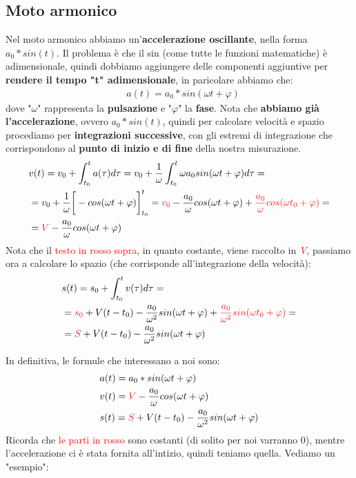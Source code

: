 		\subsection{Moto armonico}
			Nel moto armonico abbiamo un'\textbf{accelerazione oscillante}, nella forma \underline{$a_0*sin(t)$}. Il problema è che il sin (come tutte le funzioni matematiche) è adimensionale, quindi dobbiamo aggiungere delle componenti aggiuntive per \textbf{rendere il tempo "t" adimensionale}, in paricolare abbiamo che:
			\begin{align*}
				&a(t) = a_0 * sin(\omega t + \varphi)
			\end{align*}
			dove "$\omega$" rappresenta la \textbf{pulsazione} e "$\varphi$" la \textbf{fase}. Nota che \textbf{abbiamo già l'accelerazione}, ovvero $a_0*sin(t)$, quindi per calcolare velocità e spazio procediamo per \textbf{integrazioni successive}, con gli estremi di integrazione che corrispondono al \textbf{punto di inizio e di fine} della nostra misurazione.
			\begin{align*}
				&v(t)= v_0 +\int_{t_0}^ta(\tau) d\tau = v_0 + \frac{1}{\omega} \int_{t_0}^t \omega a_0 sin(\omega t+\varphi)d\tau=\\
				&=v_0 + \frac{1}{\omega} \bigg[-cos(\omega t+\varphi)\bigg]_{t_0}^t=\textcolor{Red}{v_0} - \frac{a_0}{\omega} cos(\omega t+\varphi) + \textcolor{Red}{\frac{a_0}{\omega} cos(\omega t_0+\varphi)}=\\
				&=\textcolor{Red}{V}-\frac{a_0}{\omega} cos(\omega t+\varphi)
			\end{align*}
			Nota che il \textcolor{Red}{testo in rosso sopra}, in quanto costante, viene raccolto in \textit{\textcolor{Red}{V}}, passiamo ora a calcolare lo spazio (che corrisponde all'integrazione della velocità):
			\begin{align*}
				&s(t)= s_0 +\int_{t_0}^tv(\tau) d\tau =\\
				&=\textcolor{Red}{s_0} + V(t-t_0) - \frac{a_0}{\omega^2} sin(\omega t+\varphi) + \textcolor{Red}{\frac{a_0}{\omega^2} sin(\omega t_0+\varphi)}=\\
				&=\textcolor{Red}{S} + V(t-t_0) -\frac{a_0}{\omega^2} sin(\omega t+\varphi)
			\end{align*}

			In definitiva, le formule che interessano a noi sono:
			\begin{align*}
				&a(t)=a_0 * sin(\omega t + \varphi)\\
				&v(t)=\textcolor{Red}{V}-\frac{a_0}{\omega} cos(\omega t+\varphi)\\
				&s(t)=\textcolor{Red}{S} + V(t-t_0) -\frac{a_0}{\omega^2} sin(\omega t+\varphi)\\
			\end{align*}
			Ricorda che \textcolor{Red}{le parti in rosso} sono costanti (di solito per noi varranno 0), mentre l'accelerazione ci è stata fornita all'intizio, quindi teniamo quella. Vediamo un "esempio":

